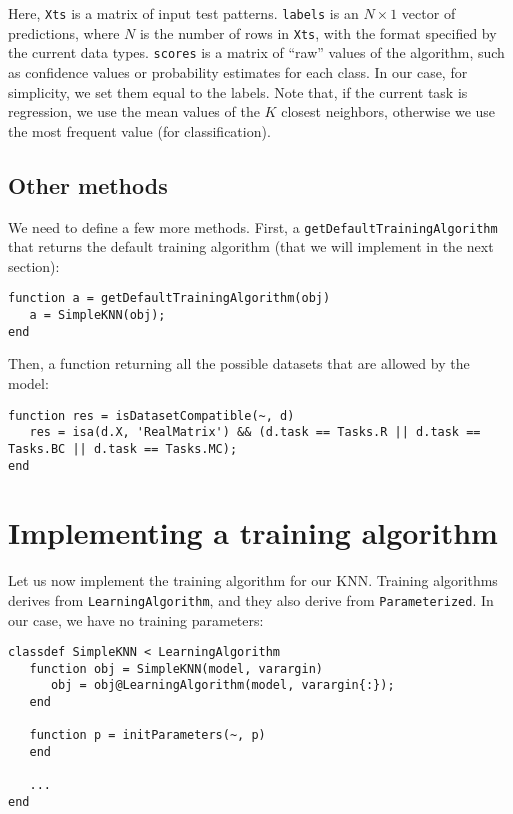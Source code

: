 Here, \verb|Xts| is a matrix of input test patterns. \verb|labels| is an $N \times 1$ vector of predictions, where $N$ is the number of rows in \verb|Xts|, with the format specified by the current data types. \verb|scores| is a matrix of ``raw'' values of the algorithm, such as confidence values or probability estimates for each class. In our case, for simplicity, we set them equal to the labels. Note that, if the current task is regression, we use the mean values of the $K$ closest neighbors, otherwise we use the most frequent value (for classification).

\subsection{Other methods}

We need to define a few more methods. First, a \verb|getDefaultTrainingAlgorithm| that returns the default training algorithm (that we will implement in the next section):

\begin{lstlisting}
function a = getDefaultTrainingAlgorithm(obj)
   a = SimpleKNN(obj);
end
\end{lstlisting}

\noindent Then, a function returning all the possible datasets that are allowed by the model:

\begin{lstlisting}
function res = isDatasetCompatible(~, d)
   res = isa(d.X, 'RealMatrix') && (d.task == Tasks.R || d.task == Tasks.BC || d.task == Tasks.MC);
end
\end{lstlisting}

\section{Implementing a training algorithm}

Let us now implement the training algorithm for our KNN. Training algorithms derives from \verb|LearningAlgorithm|, and they also derive from \verb|Parameterized|. In our case, we have no training parameters:

\begin{lstlisting}
classdef SimpleKNN < LearningAlgorithm
   function obj = SimpleKNN(model, varargin)
      obj = obj@LearningAlgorithm(model, varargin{:});
   end
        
   function p = initParameters(~, p)
   end
   
   ...
end
\end{lstlisting}

